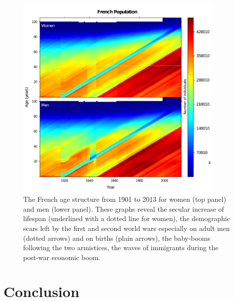 \begin{figure}[!ht] %
\centering
\includegraphics[width=0.9\textwidth]{2_Methodo/Fig/06}
\caption[The
French age structure from 1901 to 2013]{ The
French age structure from 1901 to 2013 for women (top panel) and men (lower
 panel). These graphs reveal the secular increase of lifespan (underlined with a
 dotted line for women), the demographic scars left by the first and second
 world wars especially on adult men (dotted arrows) and on births (plain
 arrows), the baby-booms following the two armistices, the waves of immigrants
 during the post-war economic boom.
  }
\label{fig:ASTd6}
\end{figure}

\section{Conclusion}

